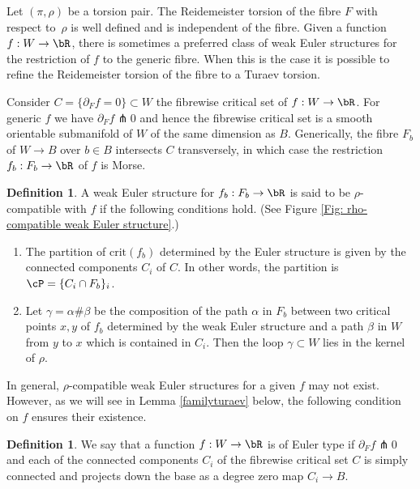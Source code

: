 \documentclass[JEP,XML,SOM,Unicode,NoFloatCountersInSection]{cedram}
\newcommand{\crit}{\mathrm{crit}}
\theoremstyle{plain}
\theoremstyle{definition}
\newtheorem{definition}[theorem]{Definition}
\begin{document}
Let $(\pi,\rho)$ be a torsion pair. The Reidemeister torsion of the fibre $F$ with respect to~$\rho$ is well defined and is independent of the fibre. Given a function $f:W \to \bR$, there is sometimes a preferred class of weak Euler structures for the restriction of $f$ to the generic fibre. When this is the case it is possible to refine the Reidemeister torsion of the fibre to a Turaev torsion.

Consider $C=\{ \partial_F f = 0 \} \subset W$ the fibrewise critical set of $f:W \to \bR$. For generic $f$ we have $\partial_F f \pitchfork 0$ and hence the fibrewise critical set is a smooth orientable submanifold of $W$ of the same dimension as $B$. Generically, the fibre $F_b$ of $W \to B$ over $b \in B$ intersects $C$ transversely, in which case the restriction $f_b: F_b \to \bR$ of $f$ is Morse.

\begin{definition}\label{def:317}
A weak Euler structure for $f_b:F_b \to \bR$ is said to be $\rho$-compatible with $f$ if the following conditions hold. (See Figure \ref{Fig: rho-compatible weak Euler structure}.)
\begin{enumerate}
\item\label{def:3171}
The partition of $\crit(f_b)$ determined by the Euler structure is given by the connected components $C_i$ of $C$. In other words, the partition is $\cP= \{ C_i \cap F_b \}_i$.
\item\label{def:3172}
Let $\gamma= \alpha \# \beta$ be the composition of the path $\alpha$ in $F_b$ between two critical points $x,y$ of $f_b$ determined by the weak Euler structure and a path $\beta$ in $W$ from $y$ to $x$ which is contained in $C_i$. Then the loop $\gamma \subset W$ lies in the kernel of $\rho$.
\end{enumerate}
\end{definition}

In general, $\rho$-compatible weak Euler structures for a given $f$ may not exist. However, as we will see in Lemma \ref{familyturaev} below, the following condition on $f$ ensures their existence.

\begin{definition}\label{Def: function euler}
We say that a function $f:W \to \bR$ is of Euler type if $\partial_F f \pitchfork 0$ and each of the connected components $C_i$ of the fibrewise critical set $C$ is simply connected and projects down the base as a degree zero map $C_i \to B$.
\end{definition}
\end{document}
